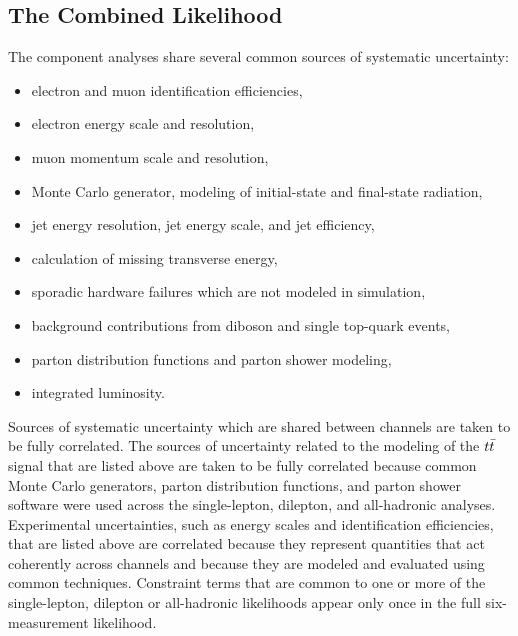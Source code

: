 \subsection{The Combined Likelihood}
\label{sec:comb}

The component analyses share several common sources of systematic uncertainty:
\begin{itemize}
\item electron and muon identification efficiencies,
\item electron energy scale and resolution,
\item muon momentum scale and resolution,
\item Monte Carlo generator, modeling of initial-state and final-state radiation,
\item jet energy resolution, jet energy scale, and jet efficiency,
\item calculation of missing transverse energy,
\item sporadic hardware failures which are not modeled in simulation,
\item background contributions from diboson and single top-quark events,
\item parton distribution functions and parton shower modeling,
\item integrated luminosity.
\end{itemize}


Sources of systematic uncertainty which are shared between channels are taken to be fully correlated.
The sources of uncertainty related to the modeling of the $t\bar{t}$ signal that are listed above are taken to be fully correlated because common Monte Carlo generators, parton distribution functions, and parton shower software were used across the single-lepton, dilepton, and all-hadronic analyses.
Experimental uncertainties, such as energy scales and identification efficiencies, that are listed above are correlated because they represent quantities that act coherently across channels and because they are modeled and evaluated using common techniques.
Constraint terms that are common to one or more of the single-lepton, dilepton or all-hadronic likelihoods appear only once in the full six-measurement likelihood.


